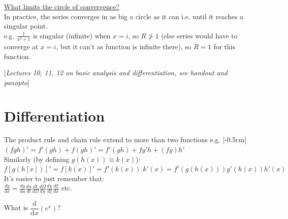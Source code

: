 \underline{What limits the circle of convergence?}\\

In practice, the series converges in as big a circle as it can i.e. until it reaches a singular point.\\

e.g. $\frac{1}{x^2+1}$ is singular (infinite) when $x=i$, so $R \ngtr 1$ (else series would have to converge at $x = i$, but it can't as function is infinite there), so $R = 1$ for this function.




 
 








\vspace*{\fill}
\hfill
\begin{center}
[\textit{Lectures 10, 11, 12 on basic analysis and differentiation, see handout and panopto}]
\end{center}
\vspace{\fill}
\newpage


\section{Differentiation}
The product rule and chain rule extend to more than two functions e.g. [-0.5cm]\\


$(fgh)' = f'(gh) + f(gh)' = f'(gh) + fg'h + (fg)h'$\\

Similarly (by defining $g(h(x)) \equiv k(x)$):\\
 $f[g(h[x])]' = f[k(x)]' = f'(k(x)).k'(x) = f'(g(h(x)))g'(h(x))h'(x)$\\
 
 It's easier to just remember that:\\
 
 $\displaystyle{
 \frac{dy}{dx} = 
 \frac{dy}{du}
 \frac{du}{dt}
 \frac{dt}{d\Omega}
 \frac{d\Omega}{d\chi}
 \frac{d\chi}{d\xi}
 \frac{d\xi}{dx}   
 }$ etc.\\
 

What is $\dfrac{\mathrm{d}}{\mathrm{d}x} (e^x)$?\\

